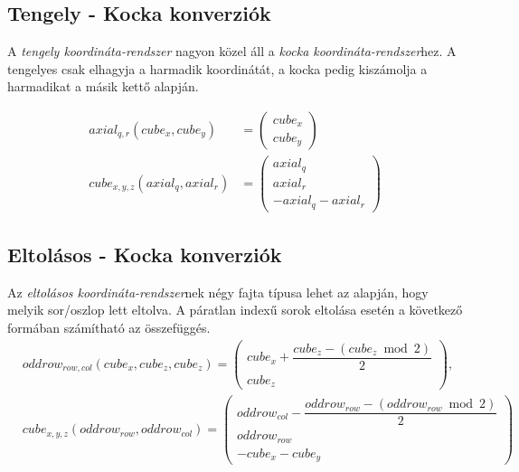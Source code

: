 \subsection{Tengely - Kocka konverziók}
\cite{redblobgamesHexagonalGrids}

A \textit{tengely koordináta-rendszer} nagyon közel áll a \textit{kocka koordináta-rendszer}hez. A tengelyes csak elhagyja a harmadik koordinátát, a kocka pedig kiszámolja a harmadikat a másik kettő alapján.


\begin{align*}
axial_{q, r}(cube_{x}, cube_{y}) &=
\left(
\begin{array}{c}
cube_{x} \\
cube_{y}
\end{array}
\right)
\\
cube_{x,y,z} (axial_{q}, axial_{r}) &=
\left(
\begin{array}{c}
axial_q \\
axial_r \\
-axial_q - axial_r
\end{array}
\right)
\end{align*}

\subsection{Eltolásos - Kocka konverziók}
\cite{redblobgamesHexagonalGrids}

Az \textit{eltolásos koordináta-rendszer}nek négy fajta típusa lehet az alapján, hogy melyik sor/oszlop lett eltolva. A páratlan indexű sorok eltolása esetén a következő formában számítható az összefüggés.
\begin{align*}
&oddrow_{row, col}(cube_{x},cube_{z}, cube_{z}) =
\left(
\begin{array}{c}
cube_{x} + \dfrac{cube_{z} - (cube_{z} \bmod 2)}{2} \\
cube_{z}
\end{array}
\right),
\\
&cube_{x, y, z}(oddrow_{row}, oddrow_{col}) =
\left(
\begin{array}{c}
oddrow_{col} - \dfrac{oddrow_{row} - (oddrow_{row} \bmod 2)}{2} \\
oddrow_{row} \\
-cube_{x} - cube_{y}
\end{array}
\right)
\end{align*}

